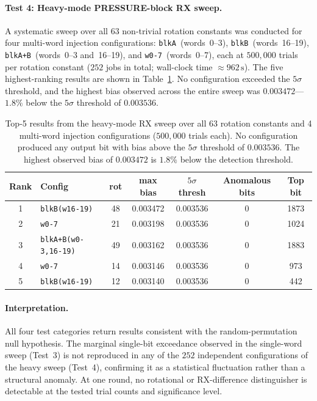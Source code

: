 \documentclass[11pt,a4paper]{article}
\begin{document}
\paragraph{Test 4: Heavy-mode PRESSURE-block RX sweep.}
A systematic sweep over all $63$ non-trivial rotation constants was conducted for
four multi-word injection configurations: \texttt{blkA}~(words~0--3),
\texttt{blkB}~(words~16--19), \texttt{blkA+B}~(words~0--3 and~16--19), and
\texttt{w0-7}~(words~0--7), each at $500{,}000$ trials per rotation constant
($252$ jobs in total; wall-clock time ${\approx}962\,\mathrm{s}$).  The five
highest-ranking results are shown in Table~\ref{tab:rotational}.  No configuration
exceeded the $5\sigma$ threshold, and the highest bias observed across the entire
sweep was $0.003472$---$1.8\%$ below the $5\sigma$ threshold of $0.003536$.

\begin{table}[h]
\centering
\renewcommand{\arraystretch}{1.2}
\begin{tabular}{clccccc}
  \toprule
  \textbf{Rank} & \textbf{Config} & \textbf{rot} &
  \textbf{max bias} & \textbf{$5\sigma$ thresh} &
  \textbf{Anomalous bits} & \textbf{Top bit} \\
  \midrule
  1 & \texttt{blkB(w16-19)} & 48 & 0.003472 & 0.003536 & 0 & 1873 \\
  2 & \texttt{w0-7}         & 21 & 0.003198 & 0.003536 & 0 & 1024 \\
  3 & \texttt{blkA+B(w0-3,16-19)} & 49 & 0.003162 & 0.003536 & 0 & 1883 \\
  4 & \texttt{w0-7}         & 14 & 0.003146 & 0.003536 & 0 &  973 \\
  5 & \texttt{blkB(w16-19)} & 12 & 0.003140 & 0.003536 & 0 &  442 \\
  \bottomrule
\end{tabular}
\caption{Top-5 results from the heavy-mode RX sweep over all 63 rotation
constants and 4 multi-word injection configurations ($500{,}000$ trials each).
No configuration produced any output bit with bias above the $5\sigma$ threshold
of $0.003536$.  The highest observed bias of $0.003472$ is $1.8\%$ below the
detection threshold.}
\label{tab:rotational}
\end{table}

\paragraph{Interpretation.}
All four test categories return results consistent with the random-permutation
null hypothesis.  The marginal single-bit exceedance observed in the single-word
sweep (Test~3) is not reproduced in any of the $252$ independent configurations
of the heavy sweep (Test~4), confirming it as a statistical fluctuation rather
than a structural anomaly.  At one round, no rotational or RX-difference
distinguisher is detectable at the tested trial counts and significance level.
\end{document}
